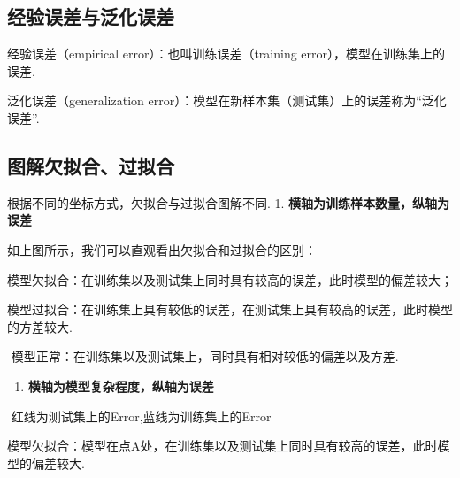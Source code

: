 
\subsection{经验误差与泛化误差}\label{ux7ecfux9a8cux8befux5deeux4e0eux6cdbux5316ux8befux5dee}

经验误差（empirical error）：也叫训练误差（training
error），模型在训练集上的误差.

泛化误差（generalization
error）：模型在新样本集（测试集）上的误差称为``泛化误差''.

\subsection{图解欠拟合、过拟合}\label{ux56feux89e3ux6b20ux62dfux5408ux8fc7ux62dfux5408}

根据不同的坐标方式，欠拟合与过拟合图解不同. 1.
\textbf{横轴为训练样本数量，纵轴为误差}


如上图所示，我们可以直观看出欠拟合和过拟合的区别：

​
模型欠拟合：在训练集以及测试集上同时具有较高的误差，此时模型的偏差较大；

​
模型过拟合：在训练集上具有较低的误差，在测试集上具有较高的误差，此时模型的方差较大.

​ 模型正常：在训练集以及测试集上，同时具有相对较低的偏差以及方差.

\begin{enumerate}
\def\labelenumi{\arabic{enumi}.}
\setcounter{enumi}{1}
\item
  \textbf{横轴为模型复杂程度，纵轴为误差}
\end{enumerate}


​ 红线为测试集上的Error,蓝线为训练集上的Error

​
模型欠拟合：模型在点A处，在训练集以及测试集上同时具有较高的误差，此时模型的偏差较大.

